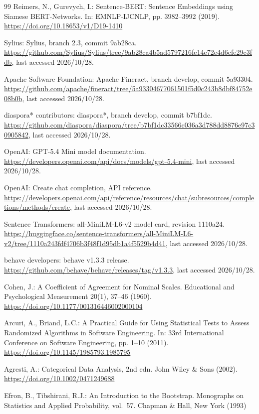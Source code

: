 \begin{thebibliography}{99}
Reimers, N., Gurevych, I.: Sentence-BERT: Sentence Embeddings using Siamese BERT-Networks. In: EMNLP-IJCNLP, pp. 3982--3992 (2019). \url{https://doi.org/10.18653/v1/D19-1410}

Sylius: Sylius, branch 2.3, commit 9ab28ca. \url{https://github.com/Sylius/Sylius/tree/9ab28ca4b5ad5797216fe14e72e4d6cfe29c3fdb}, last accessed 2026/10/28.

Apache Software Foundation: Apache Fineract, branch develop, commit 5a93304. \url{https://github.com/apache/fineract/tree/5a93304677061501f5d0c243b8dbf84752e08b0b}, last accessed 2026/10/28.

diaspora* contributors: diaspora*, branch develop, commit b7bf1dc. \url{https://github.com/diaspora/diaspora/tree/b7bf1dc33566c036a3d788dd8876e97c30905842}, last accessed 2026/10/28.

OpenAI: GPT-5.4 Mini model documentation. \url{https://developers.openai.com/api/docs/models/gpt-5.4-mini}, last accessed 2026/10/28.

OpenAI: Create chat completion, API reference. \url{https://developers.openai.com/api/reference/resources/chat/subresources/completions/methods/create}, last accessed 2026/10/28.

Sentence Transformers: all-MiniLM-L6-v2 model card, revision 1110a24. \url{https://huggingface.co/sentence-transformers/all-MiniLM-L6-v2/tree/1110a243fdf4706b3f48f1d95db1a4f5529b4d41}, last accessed 2026/10/28.

behave developers: behave v1.3.3 release. \url{https://github.com/behave/behave/releases/tag/v1.3.3}, last accessed 2026/10/28.

Cohen, J.: A Coefficient of Agreement for Nominal Scales. Educational and Psychological Measurement 20(1), 37--46 (1960). \url{https://doi.org/10.1177/001316446002000104}

Arcuri, A., Briand, L.C.: A Practical Guide for Using Statistical Tests to Assess Randomized Algorithms in Software Engineering. In: 33rd International Conference on Software Engineering, pp. 1--10 (2011). \url{https://doi.org/10.1145/1985793.1985795}

Agresti, A.: Categorical Data Analysis, 2nd edn. John Wiley \& Sons (2002). \url{https://doi.org/10.1002/0471249688}

Efron, B., Tibshirani, R.J.: An Introduction to the Bootstrap. Monographs on Statistics and Applied Probability, vol.~57. Chapman \& Hall, New York (1993)


\end{thebibliography}
